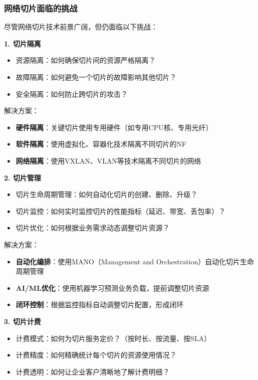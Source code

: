 \subsubsection{网络切片面临的挑战}

尽管网络切片技术前景广阔，但仍面临以下挑战：

\textbf{1. 切片隔离}
\begin{itemize}
    \item 资源隔离：如何确保切片间的资源严格隔离？
    \item 故障隔离：如何避免一个切片的故障影响其他切片？
    \item 安全隔离：如何防止跨切片的攻击？
\end{itemize}

解决方案：
\begin{itemize}
    \item \textbf{硬件隔离}：关键切片使用专用硬件（如专用CPU核、专用光纤）
    \item \textbf{软件隔离}：使用虚拟化、容器化技术隔离不同切片的NF
    \item \textbf{网络隔离}：使用VXLAN、VLAN等技术隔离不同切片的网络
\end{itemize}

\textbf{2. 切片管理}
\begin{itemize}
    \item 切片生命周期管理：如何自动化切片的创建、删除、升级？
    \item 切片监控：如何实时监控切片的性能指标（延迟、带宽、丢包率）？
    \item 切片优化：如何根据业务需求动态调整切片资源？
\end{itemize}

解决方案：
\begin{itemize}
    \item \textbf{自动化编排}：使用MANO（Management and Orchestration）自动化切片生命周期管理
    \item \textbf{AI/ML优化}：使用机器学习预测业务负载，提前调整切片资源
    \item \textbf{闭环控制}：根据监控指标自动调整切片配置，形成闭环
\end{itemize}

\textbf{3. 切片计费}
\begin{itemize}
    \item 计费模式：如何为切片服务定价？（按时长、按流量、按SLA）
    \item 计费精度：如何精确统计每个切片的资源使用情况？
    \item 计费透明：如何让企业客户清晰地了解计费明细？
\end{itemize}

